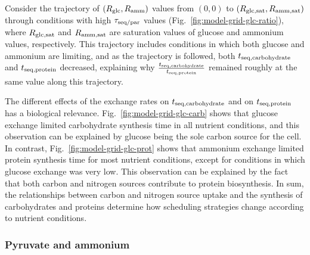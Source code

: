 Consider the trajectory of $(R_{\mathrm{glc}}, R_{\mathrm{amm}})$ values from $(0, 0)$ to $(R_{\mathrm{glc, sat}}, R_{\mathrm{amm, sat}})$ through conditions with high $\tau_{\mathrm{seq}/\mathrm{par}}$ values (Fig.\ \ref{fig:model-grid-glc-ratio}), where $R_{\mathrm{glc, sat}}$ and $R_{\mathrm{amm, sat}}$ are saturation values of glucose and ammonium values, respectively.
This trajectory includes conditions in which both glucose and ammonium are limiting, and as the trajectory is followed, both $t_{\mathrm{seq},\mathrm{carbohydrate}}$ and $t_{\mathrm{seq},\mathrm{protein}}$ decreased, explaining why $\frac{t_{\mathrm{seq},\mathrm{carbohydrate}}}{t_{\mathrm{seq},\mathrm{protein}}}$ remained roughly at the same value along this trajectory.

The different effects of the exchange rates on $t_{\mathrm{seq},\mathrm{carbohydrate}}$ and on $t_{\mathrm{seq},\mathrm{protein}}$ has a biological relevance.
Fig.\ \ref{fig:model-grid-glc-carb} shows that glucose exchange limited carbohydrate synthesis time in all nutrient conditions, and this observation can be explained by glucose being the sole carbon source for the cell.
In contrast, Fig.\ \ref{fig:model-grid-glc-prot} shows that ammonium exchange limited protein synthesis time for most nutrient conditions, except for conditions in which glucose exchange was very low.
This observation can be explained by the fact that both carbon and nitrogen sources contribute to protein biosynthesis.
In sum, the relationships between carbon and nitrogen source uptake and the synthesis of carbohydrates and proteins determine how scheduling strategies change according to nutrient conditions.


\subsubsection{Pyruvate and ammonium}
\label{subsec:model-grid-pyruvate}

